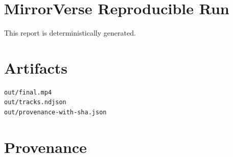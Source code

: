 \documentclass{article}
\begin{document}
\section*{MirrorVerse Reproducible Run}

This report is deterministically generated.

\section*{Artifacts}

\begin{verbatim}
out/final.mp4
out/tracks.ndjson
out/provenance-with-sha.json
\end{verbatim}

\section*{Provenance}


\end{document}
